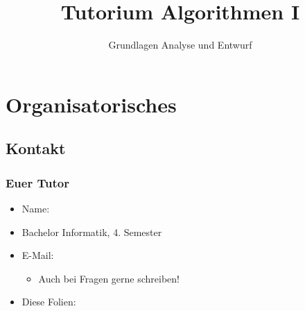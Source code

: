 

\title[Tutorium Algorithmen I]{Tutorium Algorithmen I}
\subtitle{Grundlagen Analyse und Entwurf}



\begin{frame}
  \titlepage
\end{frame}


\section{Organisatorisches}
\subsection{Kontakt}
\begin{frame}
  \frametitle{Euer Tutor}
  \begin{itemize}
    \item Name: \authorName
    \item Bachelor Informatik, 4. Semester
    \item E-Mail: \authorEmail
      \begin{itemize}
      \item Auch bei Fragen gerne schreiben!
      \end{itemize}
    \item Diese Folien: \authorHomepage
  \end{itemize}
\end{frame}

